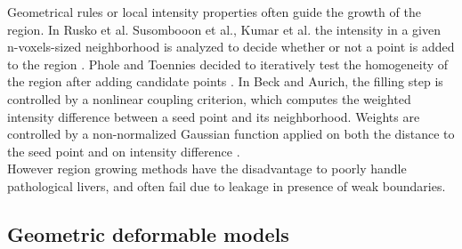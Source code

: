 \documentclass[]{article}
\begin{document}
	
	Geometrical rules or local intensity properties often guide the growth
	of the region. In Rusko et al. Susombooon et al., Kumar et al. the intensity in a given n-voxels-sized neighborhood is analyzed
	to decide whether or not a point is added to the region \cite{Rusko2007, Susomboon2007, Kumar2013}. 
	Phole and Toennies decided to iteratively test the homogeneity of the
	region after adding candidate points \cite{Pohle2001}
	. In Beck and Aurich, the filling step is controlled by a nonlinear
	coupling criterion, which computes the weighted intensity difference
	between a seed point and its neighborhood. Weights are controlled by a
	non-normalized Gaussian function applied on both the distance to the
	seed point and on intensity difference \cite{Beck2007}.\\
	However region growing methods have the disadvantage to poorly handle
	pathological livers, and often fail due to leakage in presence of weak
	boundaries.
	
	
	\subsection*{Geometric deformable models}
	
\end{document}
